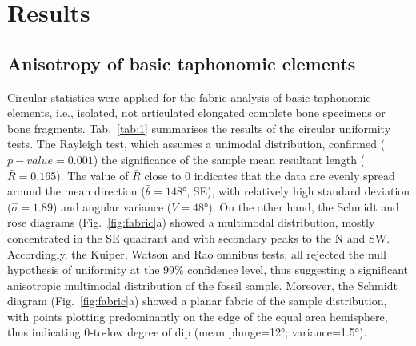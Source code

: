 \documentclass[review,times,authoryear]{elsarticle} %
\begin{document}
\section{Results}

\subsection{Anisotropy of basic taphonomic elements}

Circular statistics were applied for the fabric analysis of basic taphonomic elements, i.e., isolated, not articulated elongated complete bone specimens or bone fragments. Tab.~\ref{tab:1} summarises the results of the circular uniformity tests. The Rayleigh test, which assumes a unimodal distribution, confirmed ($p-value=0.001$) the significance of the sample mean resultant length ($\bar{R}=0.165$). The value of $\bar{R}$ close to 0 indicates that the data are evenly spread around the mean direction ($\bar{\theta}=148°$, SE), with relatively high standard deviation ($\hat{\sigma}=1.89$) and angular variance ($V=48°$). On the other hand, the Schmidt and rose diagrams (Fig.~\ref{fig:fabric}a) showed a multimodal distribution, mostly concentrated in the SE quadrant and with secondary peaks to the N and SW. Accordingly, the Kuiper, Watson and Rao omnibus tests, all rejected the null hypothesis of uniformity at the 99\% confidence level, thus suggesting a significant anisotropic multimodal distribution of the fossil sample. Moreover, the Schmidt diagram (Fig.~\ref{fig:fabric}a) showed a planar fabric of the sample distribution, with points plotting predominantly on the edge of the equal area hemisphere, thus indicating 0-to-low degree of dip (mean plunge=12°; variance=1.5°).

\begin{table}[]
  \centering
  \caption{Values and $p-values$ of circular uniformity test statistics.}
  \label{tab:1}
  \vspace{.1in}
\end{table}
\end{document}
